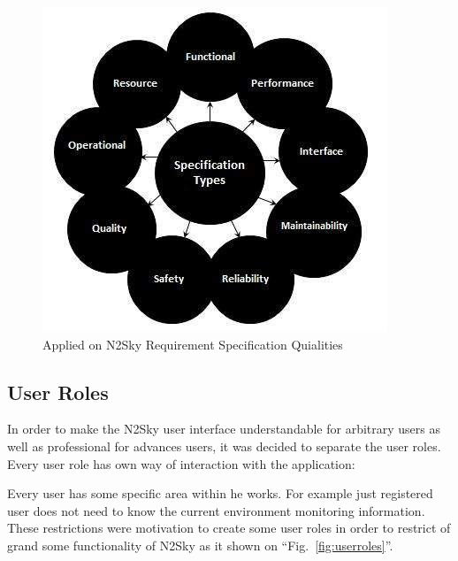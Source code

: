 \begin{figure}[htbp]
\begin{center}
  \includegraphics[scale=0.75]{components/4/pics/frs_req.jpg}
  \caption{Applied on N2Sky  Requirement Specification Quialities}
  \label{fig:frs_req}
\end{center}
\end{figure}



\subsection{User Roles}\label{User Roles}

In order to make the N2Sky user interface understandable for arbitrary users as well as professional for advances users, it was decided to separate the user roles. Every user role has own way of interaction with the application:

Every user has some specific area within he works. For example just registered user does not need to know the current environment monitoring information. These restrictions were motivation to create some user roles in order to restrict of grand some functionality of N2Sky as it shown on ``Fig.~\ref{fig:userroles}''.

